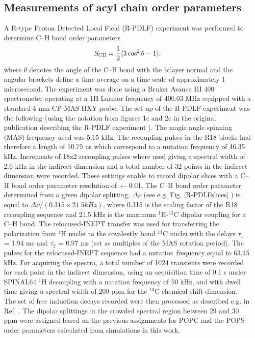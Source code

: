 \documentclass[journal=jpcbfk,manuscript=article]{achemso}
\begin{document}
\subsection{Measurements of acyl chain order parameters}
A R-type Proton Detected Local Field (R-PDLF) experiment was performed to determine C--H bond order
parameters
\begin{equation}\label{OPequation}
  S_{\rm{CH}}=\frac{1}{2}\langle3\cos^2\theta-1\rangle,
\end{equation}
  where $\theta$ denotes the angle of the C--H bond
with the bilayer normal and the angular brackets define a time average on a time scale of approximately 1 microsecond.
The experiment was done using a Bruker Avance III 400 spectrometer operating at a 1H Larmor frequency of 400.03 MHz
equipped with a standard 4 mm CP-MAS HXY probe. The set up of the R-PDLF experiment was the following
(using the notation from figures 1c and 2c in the original publication describing the R-PDLF experiment \cite{dvinskikh04}).
The magic angle spinning (MAS) frequency used was 5.15 kHz. The recoupling pulses in the R18 blocks had
therefore a length of 10.79 us which correspond to a nutation frequency of 46.35 kHz. Increments of 18x2 recoupling
pulses where used giving a spectral width of 2.6 kHz in the indirect dimension and a total number of 32 points in
the indirect dimension were recorded. These settings enable to record dipolar slices with a C--H bond order parameter
resolution of +- 0.01. The C--H bond order parameter determined from a given dipolar
splitting, $\Delta\nu$ (see e.g. Fig. \ref{R-PDLFslices} )
is equal to $\Delta\nu/(0.315\times21.5 kHz)$, where 0.315 is
the scaling factor of the R18 recoupling sequence and 21.5 kHz is the maximum $^1$H-$^{13}$C dipolar coupling for a C--H bond.
The refocused-INEPT transfer \cite{morris79,burum80} %
was used for transferring the polarization from $^1$H nuclei to the covalently bond $^{13}$C nuclei with the delays $\tau_1$ = 1.94 ms and $\tau_2$ = 0.97 ms
(set as multiples of the MAS rotation period). The pulses for the refocused-INEPT sequence had a nutation frequency equal to 63.45 kHz.
For acquiring the spectra, a total number of 1024 transients were recorded for each point in the indirect dimension, using an acquisition
time of 0.1 s under SPINAL64 $^1$H decoupling \cite{fung00} with a nutation frequency of 50 kHz, and with dwell time giving a spectral
width of 200 ppm for the $^{13}$C chemical shift dimension. The set of free induction decays recorded were then processed as
described e.g. in Ref. . The dipolar splittings in the crowded spectral region
between 29 and 30 ppm were assigned based on the previous assignments for POPC \cite{ferreira13} 
and the POPS order parameters calculated from simulations in this work.
 
\end{document}

